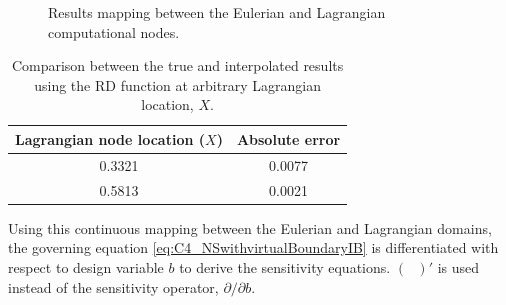 \begin{figure}[H]
    \centering
    \quad
    \caption{Results mapping between the Eulerian and Lagrangian computational nodes.}
    \label{fig:C4_euler2lagrangeExample}
\end{figure}
%
%
\begin{table}[H]
\centering
\begin{tabular}{| c | c |}
    \hline
    Lagrangian node location ($X$) & Absolute error \\ \hline \hline
    0.3321 & 0.0077 \\ \hline
    0.5813 & 0.0021 \\ \hline
\end{tabular}
\caption{Comparison between the true and interpolated results using the RD function at arbitrary Lagrangian location, $X$.}
\label{table:C4_euler2lagrangeExample}
\end{table}
%
Using this continuous mapping between the Eulerian and Lagrangian domains, the governing equation \eqref{eq:C4_NSwithvirtualBoundaryIB} is differentiated with respect to design variable $b$ to derive the sensitivity equations. $(\text{ })'$ is used instead of the sensitivity operator, $\partial/\partial b$.
%
